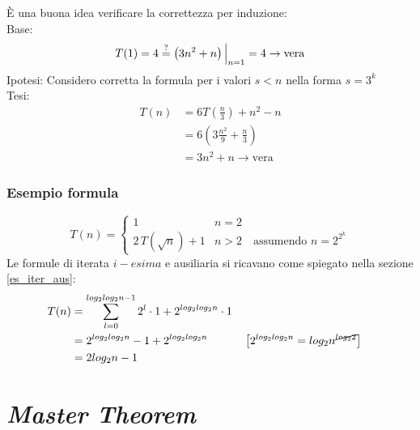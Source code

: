 È una buona idea verificare la correttezza per induzione:\\
Base: 
\[ T(1)=4 \overset{?}{=} \left( 3n^2+n \right) \Big|_{n=1} = 4 \rightarrow \text{vera} \]
Ipotesi: Considero corretta la formula per i valori $s<n$ nella forma $s=3^k$ \\
Tesi:
\begin{align*}
    T(n) &= 6T \left( \frac{n}{3} \right) + n^2 -n \\
    & = 6 \left( 3 \frac{n^2}{9} + \frac{n}{3} \right) \\
    & = 3n^2+n\rightarrow \text{vera}
\end{align*}

\subsubsection{Esempio formula}
\[
    T(n) = 
    \begin{cases} 
        1      &  n = 2 \\
        2 \, T\left( \sqrt{n}\right) + 1 & n > 2 \quad \text{assumendo } n=2^{2^k} 
    \end{cases}
\]
Le formule di iterata $i-esima$ e ausiliaria si ricavano come spiegato nella sezione \ref{es_iter_aus}:
\begin{align*}
    T(n) &= \sum_{l=0}^{log_2 log_2 n-1} 2^l \cdot 1 + 2^{log_2 log_2 n} \cdot 1 \\
    &= 2^{log_2 log_2 n} -1 + 2^{log_2 log_2 n} 
    && \left[ 2^{log_2 log_2 n} = log_2 n ^{\cancel{log_2 2}} \right] \\
    &= 2 log_2 n - 1
\end{align*}

\section{\textit{Master Theorem}}
